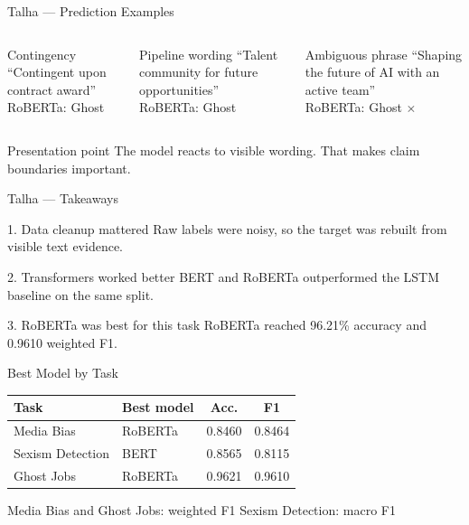 \documentclass[aspectratio=169]{beamer}
\begin{document}
\begin{frame}{Talha — Prediction Examples}
\begin{columns}[t]
\begin{block}{Contingency}
{\small ``Contingent upon contract award''}\\[0.2cm]
{\footnotesize RoBERTa: Ghost \checkmark}
\end{block}
\begin{block}{Pipeline wording}
{\small ``Talent community for future opportunities''}\\[0.2cm]
{\footnotesize RoBERTa: Ghost \checkmark}
\end{block}
\begin{block}{Ambiguous phrase}
{\small ``Shaping the future of AI with an active team''}\\[0.2cm]
{\footnotesize RoBERTa: Ghost $\times$}
\end{block}
\end{columns}
\vspace{0.35cm}
\begin{block}{Presentation point}
The model reacts to visible wording. That makes claim boundaries important.
\end{block}
\end{frame}

\begin{frame}{Talha — Takeaways}
\begin{block}{1. Data cleanup mattered}
Raw labels were noisy, so the target was rebuilt from visible text evidence.
\end{block}
\begin{block}{2. Transformers worked better}
BERT and RoBERTa outperformed the LSTM baseline on the same split.
\end{block}
\begin{block}{3. RoBERTa was best for this task}
RoBERTa reached 96.21\% accuracy and 0.9610 weighted F1.
\end{block}
\end{frame}


\begin{frame}{Best Model by Task}
\begin{center}
\begin{tabular}{llcc}
\toprule
\textbf{Task} & \textbf{Best model} & \textbf{Acc.} & \textbf{F1} \\
\midrule
Media Bias & RoBERTa & 0.8460 & 0.8464 \\
Sexism Detection & BERT & 0.8565 & 0.8115 \\
Ghost Jobs & RoBERTa & 0.9621 & 0.9610 \\
\bottomrule
\end{tabular}
\end{center}
\vspace{0.25cm}
{\footnotesize Media Bias and Ghost Jobs: weighted F1 \quad Sexism Detection: macro F1}
\end{frame}
\end{document}
